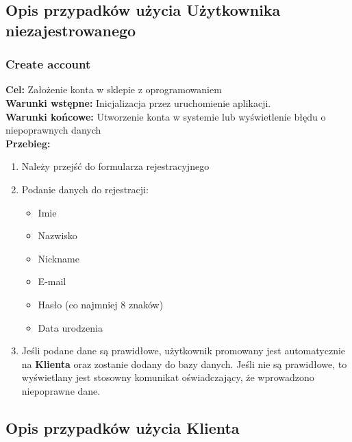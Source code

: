 \documentclass[12pt,a4paper]{article}
\begin{document}
\subsection{Opis przypadków użycia Użytkownika niezajestrowanego}

\subsubsection{Create account}
\textbf{Cel: } Założenie konta w sklepie z oprogramowaniem \\
\textbf{Warunki wstępne: }Inicjalizacja przez uruchomienie aplikacji. \\
\textbf{Warunki końcowe: } Utworzenie konta w systemie lub wyświetlenie błędu o niepoprawnych danych \\
\textbf{Przebieg:}
\begin{enumerate}
    \item Należy przejść do formularza rejestracyjnego 
    \item Podanie danych do rejestracji:
    \begin{itemize}
        \item Imie
        \item Nazwisko
        \item Nickname
        \item E-mail
        \item Hasło (co najmniej 8 znaków)
        \item Data urodzenia
    \end{itemize}
    \item Jeśli podane dane są prawidłowe, użytkownik promowany jest automatycznie na \textbf{Klienta} oraz zostanie dodany do bazy danych. Jeśli nie są prawidłowe, to wyświetlany jest stosowny komunikat oświadczający, że wprowadzono niepoprawne dane.
\end{enumerate}



\subsection{Opis przypadków użycia Klienta}

\end{document}
